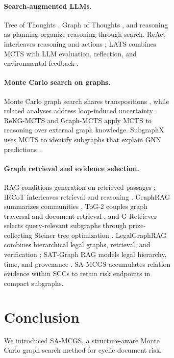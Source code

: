 \documentclass[11pt]{article}
\newcommand{\samcgs}{SA-MCGS}
\newcommand{\scc}{SCC}
\begin{document}
\begin{figure}[!t]
\begin{figure}[!t]
\paragraph{Search-augmented LLMs.}
Tree of Thoughts \citep{yao2024tree}, Graph of Thoughts \citep{besta2024graph}, and reasoning as planning \citep{hao2023reasoning} organize reasoning through search. ReAct interleaves reasoning and actions \citep{yao2023react}; LATS combines MCTS with LLM evaluation, reflection, and environmental feedback \citep{zhou2024lats}.

\paragraph{Monte Carlo search on graphs.}
Monte Carlo graph search shares transpositions \citep{childs2008transpositions,czech2021monte}, while related analyses address loop-induced uncertainty \citep{moerland2020mcts}. ReKG-MCTS \citep{song2025rekgmcts} and Graph-MCTS \citep{liu2025graphmcts} apply MCTS to reasoning over external graph knowledge. SubgraphX uses MCTS to identify subgraphs that explain GNN predictions \citep{yuan2021subgraphx}.

\paragraph{Graph retrieval and evidence selection.}
RAG conditions generation on retrieved passages \citep{lewis2020rag}; IRCoT interleaves retrieval and reasoning \citep{trivedi2023interleaving}. GraphRAG summarizes communities \citep{edge2024graphrag}, ToG-2 couples graph traversal and document retrieval \citep{ma2025tog2}, and G-Retriever selects query-relevant subgraphs through prize-collecting Steiner tree optimization \citep{he2024gretriever}. LegalGraphRAG combines hierarchical legal graphs, retrieval, and verification \citep{chen2026legalgraphrag}; SAT-Graph RAG models legal hierarchy, time, and provenance \citep{demartim2025satgraph}. \samcgs{} accumulates relation evidence within \scc{}s to retain risk endpoints in compact subgraphs.

\section{Conclusion}
\label{sec:conclusion}

We introduced \samcgs{}, a structure-aware Monte Carlo graph search method for cyclic document risk. 


\end{figure}
\end{figure}
\end{document}
